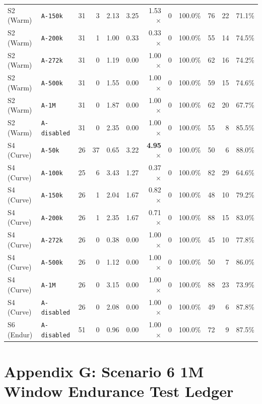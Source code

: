 \documentclass[10pt,twocolumn,a4paper]{article}
\begin{document}
\begin{table}[t]
\begin{tabular}{@{}llrrrrrrrrrr@{}}
S2 (Warm) & \texttt{A-150k} & 31 & 3 & 2.13 & 3.25 & 1.53$\times$ & 0 & 100.0\% & 76 & 22 & 71.1\% \\
S2 (Warm) & \texttt{A-200k} & 31 & 1 & 1.00 & 0.33 & 0.33$\times$ & 0 & 100.0\% & 55 & 14 & 74.5\% \\
S2 (Warm) & \texttt{A-272k} & 31 & 0 & 1.19 & 0.00 & 1.00$\times$ & 0 & 100.0\% & 62 & 16 & 74.2\% \\
S2 (Warm) & \texttt{A-500k} & 31 & 0 & 1.55 & 0.00 & 1.00$\times$ & 0 & 100.0\% & 59 & 15 & 74.6\% \\
S2 (Warm) & \texttt{A-1M} & 31 & 0 & 1.87 & 0.00 & 1.00$\times$ & 0 & 100.0\% & 62 & 20 & 67.7\% \\
S2 (Warm) & \texttt{A-disabled} & 31 & 0 & 2.35 & 0.00 & 1.00$\times$ & 0 & 100.0\% & 55 & 8 & 85.5\% \\
\midrule
S4 (Curve) & \texttt{A-50k} & 26 & 37 & 0.65 & 3.22 & \textbf{4.95$\times$} & 0 & 100.0\% & 50 & 6 & 88.0\% \\
S4 (Curve) & \texttt{A-100k} & 25 & 6 & 3.43 & 1.27 & 0.37$\times$ & 0 & 100.0\% & 82 & 29 & 64.6\% \\
S4 (Curve) & \texttt{A-150k} & 26 & 1 & 2.04 & 1.67 & 0.82$\times$ & 0 & 100.0\% & 48 & 10 & 79.2\% \\
S4 (Curve) & \texttt{A-200k} & 26 & 1 & 2.35 & 1.67 & 0.71$\times$ & 0 & 100.0\% & 88 & 15 & 83.0\% \\
S4 (Curve) & \texttt{A-272k} & 26 & 0 & 0.38 & 0.00 & 1.00$\times$ & 0 & 100.0\% & 45 & 10 & 77.8\% \\
S4 (Curve) & \texttt{A-500k} & 26 & 0 & 1.12 & 0.00 & 1.00$\times$ & 0 & 100.0\% & 50 & 7 & 86.0\% \\
S4 (Curve) & \texttt{A-1M} & 26 & 0 & 3.15 & 0.00 & 1.00$\times$ & 0 & 100.0\% & 88 & 23 & 73.9\% \\
S4 (Curve) & \texttt{A-disabled} & 26 & 0 & 2.08 & 0.00 & 1.00$\times$ & 0 & 100.0\% & 49 & 6 & 87.8\% \\
\midrule
S6 (Endur) & \texttt{A-disabled} & 51 & 0 & 0.96 & 0.00 & 1.00$\times$ & 0 & 100.0\% & 72 & 9 & 87.5\% \\
\bottomrule
\end{tabular}
\end{table}

\clearpage
\section*{Appendix G: Scenario 6 1M Window Endurance Test Ledger}
\end{document}
